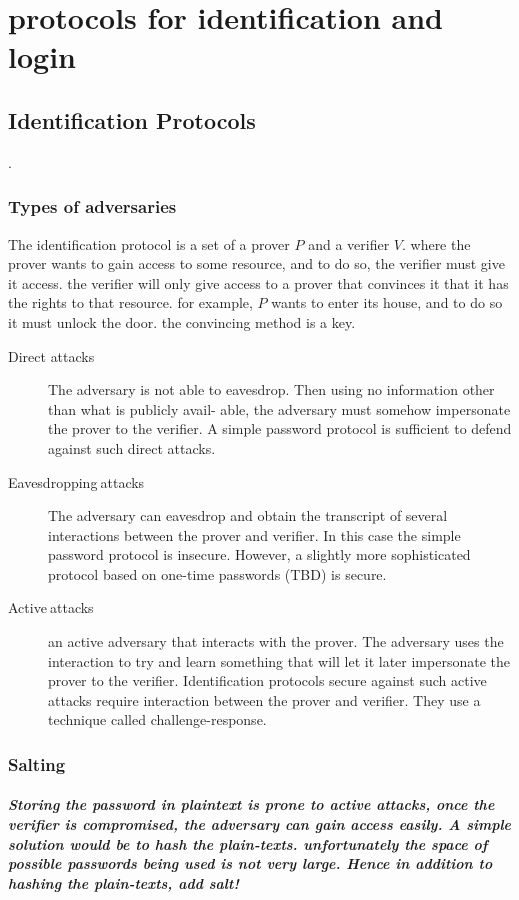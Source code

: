 \chapter{protocols for identification and login}
\section{Identification Protocols}.

\subsection{Types of adversaries}

The identification protocol is a set of a prover $P$ and a verifier
$V$. where the prover wants to gain access to some resource, and
to do so, the verifier must give it access. the verifier will only
give access to a prover that convinces it that it has the rights to
that resource. for example, $P$ wants to enter its house, and to
do so it must unlock the door. the convincing method is a key.
\begin{description}
\item [{Direct$\,\,$attacks}] The adversary is not able to eavesdrop.
Then using no information other than what is publicly avail- able,
the adversary must somehow impersonate the prover to the verifier.
A simple password protocol is sufficient to defend against such direct
attacks.
\item [{Eavesdropping$\:$attacks}] The adversary can eavesdrop and obtain
the transcript of several interactions between the prover and verifier.
In this case the simple password protocol is insecure. However, a
slightly more sophisticated protocol based on one-time passwords (TBD)
is secure.
\item [{Active$\:$attacks}] an active adversary that interacts with the
prover. The adversary uses the interaction to try and learn something
that will let it later impersonate the prover to the verifier. Identification
protocols secure against such active attacks require interaction between
the prover and verifier. They use a technique called challenge-response.
\end{description}

\subsection{Salting}

\paragraph{Storing the password in plaintext is prone to active attacks, once
the verifier is compromised, the adversary can gain access easily.
A simple solution would be to hash the plain-texts. unfortunately
the space of possible passwords being used is not very large. Hence
in addition to hashing the plain-texts, add salt! }

